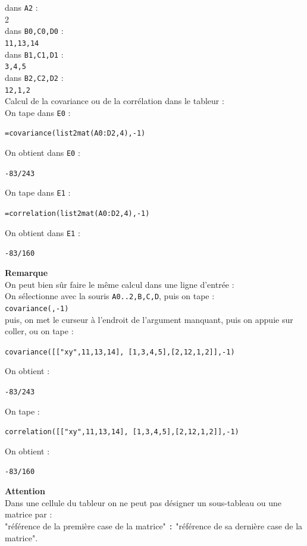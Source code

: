 \documentclass[a4paper,11pt]{book}
\begin{document}
dans {\tt A2} :\\
 2\\
dans {\tt B0,C0,D0} : \\
{\tt 11,13,14}\\ 
dans {\tt B1,C1,D1} :\\
 {\tt 3,4,5}\\ 
dans {\tt B2,C2,D2} : \\
{\tt 12,1,2}\\ 
Calcul de la covariance ou de la corr\'elation dans le tableur :\\
On tape dans {\tt E0} :
\begin{center}{\tt =covariance(list2mat(A0:D2,4),-1)}\end{center}
On obtient dans {\tt E0} : 
\begin{center}{\tt -83/243}\end{center}
On tape dans {\tt E1} :
\begin{center}{\tt =correlation(list2mat(A0:D2,4),-1)}\end{center}
On obtient dans {\tt E1} : 
\begin{center}{\tt -83/160}\end{center}
{\bf Remarque}\\ 
On peut bien s\^ur faire le m\^eme calcul dans une ligne d'entr\'ee :\\
On s\'electionne avec la souris {\tt A0..2,B,C,D}, puis on  
tape :\\
 {\tt covariance(,-1)}\\
puis, on met le curseur \`a l'endroit
 de l'argument manquant, puis on appuie sur coller,
ou on tape :
\begin{center}{\tt covariance([["xy",11,13,14], [1,3,4,5],[2,12,1,2]],-1)}\end{center} 
On obtient : 
\begin{center}{\tt -83/243}\end{center}
On tape :
\begin{center}{\tt correlation([["xy",11,13,14], [1,3,4,5],[2,12,1,2]],-1)}\end{center} 
On obtient : 
\begin{center}{\tt -83/160}\end{center}
{\bf Attention}\\
Dans une cellule du  tableur on ne peut pas d\'esigner 
un sous-tableau ou une matrice par :\\
"r\'ef\'erence de la premi\`ere case de la matrice" {\tt :}  
"r\'ef\'erence de sa derni\`ere case de la matrice".\\
\end{document}
